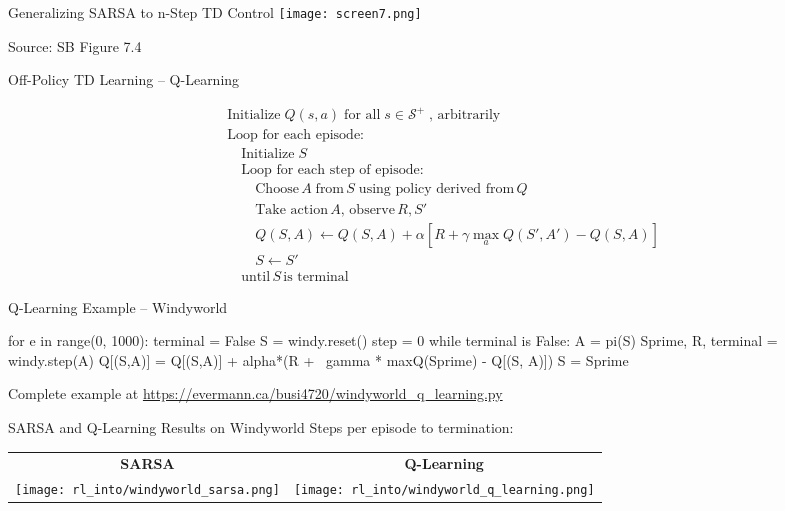 \documentclass[ignorenonframetext,xcolor=x11names]{beamer}
\begin{document}
\begin{frame}{Generalizing SARSA to n-Step TD Control}
\texttt{[image: screen7.png]}
\centering

\scriptsize
Source: SB Figure 7.4
\end{frame}


\begin{frame}{Off-Policy TD Learning -- Q-Learning}
\begin{block}{}
\begin{align*}
& \text{Initialize}\; Q(s, a) \; \text{for all} \; s \in \mathcal{S}^+ \; \text{, arbitrarily} \\
& \text{Loop for each episode:} \\
& \quad \text{Initialize}\; S \\
& \quad \text{Loop for each step of episode:} \\
& \quad \quad \text{Choose} \, A \; \text{from}\, S \; \text{using policy derived from} \, Q \\
& \quad \quad \text{Take action}\, A, \, \text{observe} \, R, S' \\
& \quad \quad Q(S, A) \leftarrow Q(S, A) + \alpha \left[ R + \gamma \operatorname*{max}_a Q(S', A') - Q(S, A) \right] \\
& \quad \quad S \leftarrow S' \\
& \quad \text{until}\, S\, \text{is terminal}
\end{align*}
\end{block}
\end{frame}

\begin{frame}[fragile]{Q-Learning Example -- Windyworld}
\begin{pythoncode}
for e in range(0, 1000):
    terminal = False
    S = windy.reset()
    step = 0
    while terminal is False:
        A = pi(S)
        Sprime, R, terminal = windy.step(A)
        Q[(S,A)] = Q[(S,A)] + alpha*(R + \
            gamma * maxQ(Sprime) - Q[(S, A)])
        S = Sprime
\end{pythoncode}

Complete example at \url{https://evermann.ca/busi4720/windyworld_q_learning.py}
\end{frame}

\begin{frame}{SARSA and Q-Learning Results on Windyworld}
Steps per episode to termination:\\

\begin{tabular}{cc}
\textbf{SARSA} & \textbf{Q-Learning} \\
\texttt{[image: rl\_into/windyworld\_sarsa.png]} & 
\texttt{[image: rl\_into/windyworld\_q\_learning.png]} 
\end{tabular}
\end{frame}
\end{document}
